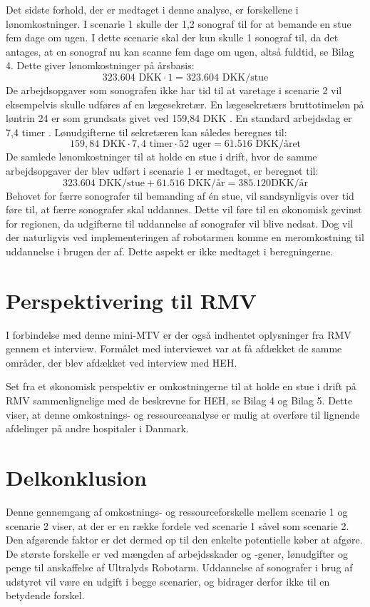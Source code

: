 Det sidste forhold, der er medtaget i denne analyse, er forskellene i lønomkostninger. I scenarie 1 skulle der 1,2 sonograf til for at bemande en stue fem dage om ugen. I dette scenarie skal der kun skulle 1 sonograf til, da det antages, at en sonograf nu kan scanne fem dage om ugen, altså fuldtid, se Bilag 4. Dette giver lønomkostninger på årsbasis:
\begin{equation}
323.604 \text{ DKK}\cdot1 = 323.604 \text{ DKK/stue}
\end{equation}
De arbejdsopgaver som sonografen ikke har tid til at varetage i scenarie 2 vil eksempelvis skulle udføres af en lægesekretær. En lægesekretærs bruttotimeløn på løntrin 24 er som grundsats givet ved 159,84 DKK \cite{Lontabel}. En standard arbejdsdag er 7,4 timer \cite{Arbejdstid}. Lønudgifterne til sekretæren kan således beregnes til:
\begin{equation}
159,84 \text{ DKK} \cdot 7,4 \text{ timer} \cdot 52 \text{ uger} = 61.516 \text{ DKK/året}
\end{equation}
De samlede lønomkostninger til at holde en stue i drift, hvor de samme arbejdsopgaver der blev udført i scenarie 1 er medtaget, er beregnet til:
\begin{equation}
323.604 \text{ DKK/stue} + 61.516 \text{ DKK/år} = 385.120 \text{DKK/år}
\end{equation}
Behovet for færre sonografer til bemanding af én stue, vil sandsynligvis over tid føre til, at færre sonografer skal uddannes. Dette vil føre til en økonomisk gevinst for regionen, da udgifterne til uddannelse af sonografer vil blive nedsat. Dog vil der naturligvis ved implementeringen af robotarmen komme en meromkostning til uddannelse i brugen der af. Dette aspekt er ikke medtaget i beregningerne. 

\section{Perspektivering til RMV}
I forbindelse med denne mini-MTV er der også indhentet oplysninger fra RMV gennem et interview. Formålet med interviewet var at få afdækket de samme områder, der blev afdækket ved interview med HEH. 

Set fra et økonomisk perspektiv er omkostningerne til at holde en stue i drift på RMV sammenlignelige med de beskrevne for HEH, se Bilag 4 og Bilag 5. Dette viser, at denne omkostnings- og ressourceanalyse er mulig at overføre til lignende afdelinger på andre hospitaler i Danmark.

\section{Delkonklusion}
Denne gennemgang af omkostnings- og ressourceforskelle mellem scenarie 1 og scenarie 2 viser, at der er en række fordele ved scenarie 1 såvel som scenarie 2. Den afgørende faktor er det dermed op til den enkelte potentielle køber at afgøre. De største forskelle er ved mængden af arbejdsskader og -gener, lønudgifter og penge til anskaffelse af Ultralyds Robotarm. Uddannelse af sonografer i brug af udstyret vil være en udgift i begge scenarier, og bidrager derfor ikke til en betydende forskel. 

